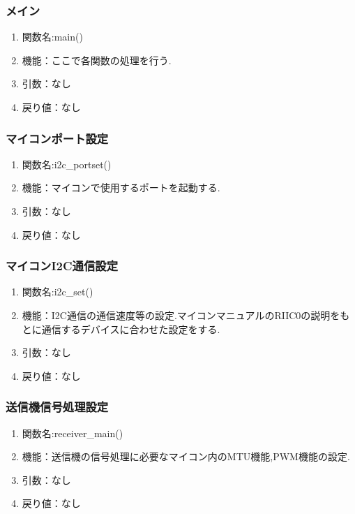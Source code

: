 \documentclass[12pt,oneside]{paper}
\begin{document}
\subsubsection{メイン}
\begin{enumerate}
\item 関数名:main()
\item 機能：ここで各関数の処理を行う.
\item 引数：なし
\item 戻り値：なし
\end{enumerate}

\subsubsection{マイコンポート設定}

\begin{enumerate}
\item 関数名:i2c\_portset()
\item 機能：マイコンで使用するポートを起動する.
\item 引数：なし
\item 戻り値：なし
\end{enumerate}

\subsubsection{マイコンI2C通信設定}

\begin{enumerate}
\item 関数名:i2c\_set()
\item 機能：I2C通信の通信速度等の設定.マイコンマニュアルのRIIC0の説明をもとに通信するデバイスに合わせた設定をする.
\item 引数：なし
\item 戻り値：なし
\end{enumerate}

\subsubsection{送信機信号処理設定}

\begin{enumerate}
\item 関数名:receiver\_main()
\item 機能：送信機の信号処理に必要なマイコン内のMTU機能,PWM機能の設定.
\item 引数：なし
\item 戻り値：なし
\end{enumerate}
\end{document}
